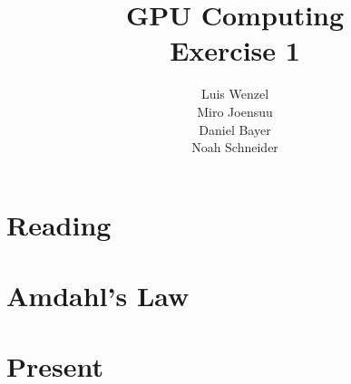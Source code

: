 \documentclass[12pt,twoside,a4paper]{article}
\title{GPU Computing\\
Exercise 1}
\author{
  Luis Wenzel\\
  Miro Joensuu\\
  Daniel Bayer\\
  Noah Schneider
}
\date{}
\begin{document}
\maketitle
\section{Reading}



\section{Amdahl's Law}


	

\section{Present}

\end{document}
